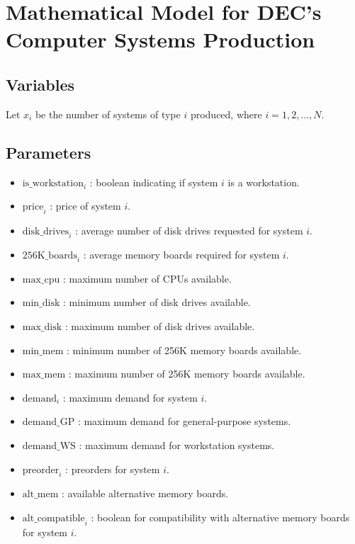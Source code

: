 \documentclass{article}
\begin{document}
\section*{Mathematical Model for DEC's Computer Systems Production}

\subsection*{Variables}
Let \( x_i \) be the number of systems of type \( i \) produced, where \( i = 1, 2, \ldots, N \).

\subsection*{Parameters}
\begin{itemize}
    \item \( \text{is\_workstation}_i \) : boolean indicating if system \( i \) is a workstation.
    \item \( \text{price}_i \) : price of system \( i \).
    \item \( \text{disk\_drives}_i \) : average number of disk drives requested for system \( i \).
    \item \( \text{256K\_boards}_i \) : average memory boards required for system \( i \).
    \item \( \text{max\_cpu} \) : maximum number of CPUs available.
    \item \( \text{min\_disk} \) : minimum number of disk drives available.
    \item \( \text{max\_disk} \) : maximum number of disk drives available.
    \item \( \text{min\_mem} \) : minimum number of 256K memory boards available.
    \item \( \text{max\_mem} \) : maximum number of 256K memory boards available.
    \item \( \text{demand}_i \) : maximum demand for system \( i \).
    \item \( \text{demand\_GP} \) : maximum demand for general-purpose systems.
    \item \( \text{demand\_WS} \) : maximum demand for workstation systems.
    \item \( \text{preorder}_i \) : preorders for system \( i \).
    \item \( \text{alt\_mem} \) : available alternative memory boards.
    \item \( \text{alt\_compatible}_i \) : boolean for compatibility with alternative memory boards for system \( i \).
\end{itemize}
\end{document}
